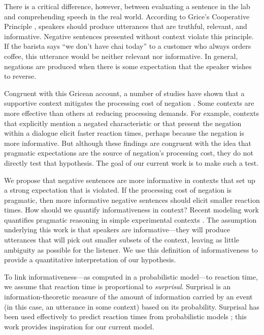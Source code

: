 \documentclass[10pt,letterpaper]{article}
\begin{document}
There is a critical difference, however, between evaluating a sentence in the lab and comprehending speech in the real world. According to Grice's Cooperative Principle \cite{grice1975}, speakers should produce utterances that are truthful, relevant, and informative.  Negative sentences presented without context violate this principle.  If the barista says ``we don't have chai today'' to a customer who always orders coffee, this utterance would be neither relevant nor informative.  In general, negations are produced when there is some expectation that the speaker wishes to reverse.  

Congruent with this Gricean account, a number of studies have shown that a supportive context mitigates the processing cost of negation \cite{wason1965, glenberg1999, ludtke2006, nieuwland2008, dale2011}. Some contexts are more effective than others at reducing processing demands. For example, contexts that explicitly mention a negated characteristic \cite{ludtke2006} or that present the negation within a dialogue \cite{dale2011} elicit faster reaction times, perhaps because the negation is more informative. But although these findings are congruent with the idea that pragmatic expectations are the source of negation's processing cost, they do not directly test that hypothesis.  The goal of our current work is to make such a test.

We propose that negative sentences are more informative in contexts that set up a strong expectation that is violated. If the processing cost of negation is pragmatic, then more informative negative sentences should elicit smaller reaction times. How should we quantify informativeness in context? Recent modeling work quantifies pragmatic reasoning in simple experimental contexts \cite{frank2012,goodman2013}. The assumption underlying this work is that speakers are informative---they will produce utterances that will pick out smaller subsets of the context, leaving as little ambiguity as possible for the listener.  We use this definition of informativeness to provide a quantitative interpretation of our hypothesis.

To link informativeness---as computed in a probabilistic model---to reaction time, we assume that reaction time is proportional to \emph{surprisal}. Surprisal is an information-theoretic measure of the amount of information carried by an event (in this case, an utterance in some context) based on its probability. Surprisal has been used effectively to predict reaction times from probabilistic models \cite{levy2008}; this work provides inspiration for our current model. 
\end{document}
